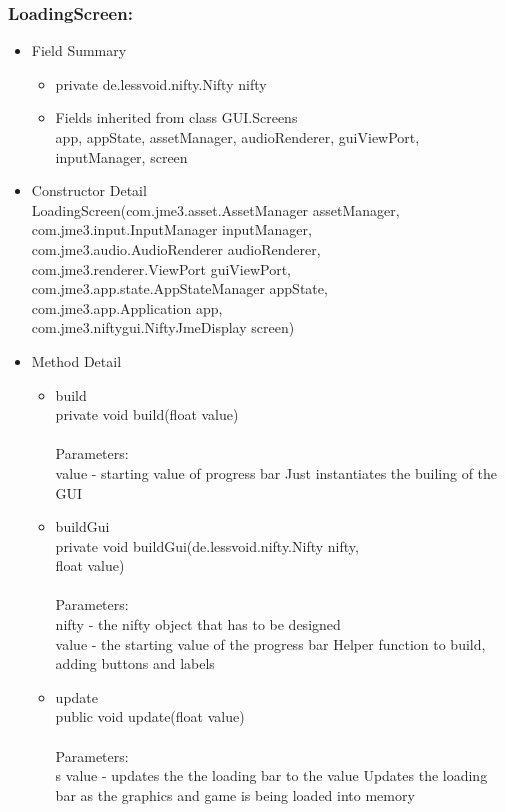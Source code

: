 \documentclass[letterpaper]{article}
\begin{document}
				\subsubsection*{LoadingScreen:}
				\vspace{0.1in}	
					\begin{itemize}
						\item	Field Summary
								\begin{itemize}
									\item	private de.lessvoid.nifty.Nifty	nifty 
									\item	Fields inherited from class GUI.Screens \\
											app, appState, assetManager, audioRenderer, guiViewPort, inputManager, screen
								\end{itemize}
						\item	Constructor Detail \\
								LoadingScreen(com.jme3.asset.AssetManager assetManager, \\
            com.jme3.input.InputManager inputManager, \\
            com.jme3.audio.AudioRenderer audioRenderer, \\
            com.jme3.renderer.ViewPort guiViewPort, \\
            com.jme3.app.state.AppStateManager appState, \\
            com.jme3.app.Application app, \\
            com.jme3.niftygui.NiftyJmeDisplay screen)
						\item	Method Detail
								\begin{itemize}
									\item	build \\
											private void build(float value) \\ \\
											Parameters: \\
											value - starting value of progress bar Just instantiates the builing of the GUI
									\item	buildGui \\
											private void buildGui(de.lessvoid.nifty.Nifty nifty, \\
		            float value) \\ \\
											Parameters: \\
											nifty - the nifty object that has to be designed \\
											value - the starting value of the progress bar Helper function to build, adding buttons and labels
									\item	update \\
											public void update(float value) \\ \\
											Parameters: \\s
											value - updates the the loading bar to the value Updates the loading bar as the graphics and game is being loaded into memory
								\end{itemize}
					\end{itemize}
					
\end{document}
